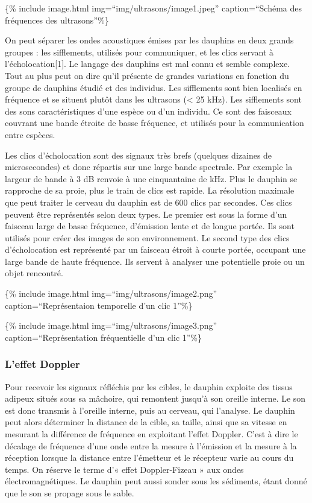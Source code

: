 \{\% include image.html img=``img/ultrasons/image1.jpeg''
caption=``Schéma des fréquences des ultrasons''\%\}

On peut séparer les ondes acoustiques émises par les dauphins en deux
grands groupes : les sifflements, utilisés pour communiquer, et les
clics servant à l'écholocation{[}1{]}. Le langage des dauphins est mal
connu et semble complexe. Tout au plus peut on dire qu'il présente de
grandes variations en fonction du groupe de dauphins étudié et des
individus. Les sifflements sont bien localisés en fréquence et se
situent plutôt dans les ultrasons (\textless{} 25 kHz). Les sifflements
sont des sons caractéristiques d'une espèce ou d'un individu. Ce sont
des faisceaux couvrant une bande étroite de basse fréquence, et utilisés
pour la communication entre espèces.

Les clics d'écholocation sont des signaux très brefs (quelques dizaines
de microsecondes) et donc répartis sur une large bande spectrale. Par
exemple la largeur de bande à 3 dB renvoie à une cinquantaine de kHz.
Plus le dauphin se rapproche de sa proie, plus le train de clics est
rapide. La résolution maximale que peut traiter le cerveau du dauphin
est de 600 clics par secondes. Ces clics peuvent être représentés selon
deux types. Le premier est sous la forme d'un faisceau large de basse
fréquence, d'émission lente et de longue portée. Ils sont utilisés pour
créer des images de son environnement. Le second type des clics
d'écholocation est représenté par un faisceau étroit à courte portée,
occupant une large bande de haute fréquence. Ils servent à analyser une
potentielle proie ou un objet rencontré.

\{\% include image.html img=``img/ultrasons/image2.png''
caption=``Représentaion temporelle d'un clic 1''\%\}

\{\% include image.html img=``img/ultrasons/image3.png''
caption=``Représentation fréquentielle d'un clic 1''\%\}

\subsubsection{L'effet Doppler}\label{leffet-doppler}

Pour recevoir les signaux réfléchis par les cibles, le dauphin exploite
des tissus adipeux situés sous sa mâchoire, qui remontent jusqu'à son
oreille interne. Le son est donc transmis à l'oreille interne, puis au
cerveau, qui l'analyse. Le dauphin peut alors déterminer la distance de
la cible, sa taille, ainsi que sa vitesse en mesurant la différence de
fréquence en exploitant l'effet Doppler. C'est à dire le décalage de
fréquence d'une onde entre la mesure à l'émission et la mesure à la
réception lorsque la distance entre l'émetteur et le récepteur varie au
cours du temps. On réserve le terme d'« effet Doppler-Fizeau » aux ondes
électromagnétiques. Le dauphin peut aussi sonder sous les sédiments,
étant donné que le son se propage sous le sable.


